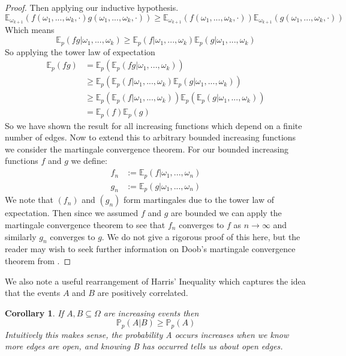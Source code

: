 \documentclass[a4paper,11pt]{article}
\newtheorem{corollary}[theorem]{Corollary}
\theoremstyle{definition}
\newcommand{\prob}{\mathbb{P}_p}
\newcommand{\expp}{\mathbb{E}_p}
\begin{document}
\begin{proof}
	Then applying our inductive hypothesis.
	$$\mathbb{E}_{\omega_{k+1}}(f(\omega_1,...,\omega_k,\cdot)g(\omega_1,...,\omega_k,\cdot))
	\geq \mathbb{E}_{\omega_{k+1}}(f(\omega_1,...,\omega_k,\cdot))\mathbb{E}_{\omega_{k+1}}(g(\omega_1,...,\omega_k,\cdot))$$
	Which means
	$$ \mathbb{E}_p(fg|\omega_1,...,\omega_k) \geq \mathbb{E}_p(f|\omega_1,...,\omega_k)\mathbb{E}_p(g|\omega_1,...,\omega_k)$$
	So applying the tower law of expectation 
	\begin{align*}
		\expp(fg) &= \expp(\expp(fg|\omega_1,...,\omega_k))\\
		&\geq \expp(\expp(f|\omega_1,...,\omega_k)\expp(g|\omega_1,...,\omega_k))\\
		&\geq \expp(\expp(f|\omega_1,...,\omega_k))\expp(\expp(g|\omega_1,...,\omega_k))\\
		&= \expp(f)\expp(g)
	\end{align*}
	So we have shown the result for all increasing functions which depend on a finite number of edges.
	Now to extend this to arbitrary bounded increasing functions we consider the martingale convergence theorem.
	For our bounded increasing functions $f$ and $g$ we define:
	\begin{align*}
		f_n &:= \expp(f | \omega_1,...,\omega_n)\\
		g_n &:= \expp(g | \omega_1,...,\omega_n)
	\end{align*}
	We note that $(f_n)$ and $(g_n)$ form martingales due to the tower law of expectation.
	Then since we assumed $f$ and $g$ are bounded we can apply the martingale convergence theorem to see that $f_n$ converges to $f$  as $n \rightarrow \infty$ and similarly $g_n$ converges to $g$.
	We do not give a rigorous proof of this here, but the reader may wish to seek further information on Doob's martingale convergence theorem from \cite{williams_1991}.
	

\end{proof}
We also note a useful rearrangement of Harris' Inequality which captures the idea that the events $A$ and $B$ are positively correlated.
\begin{corollary}
	If $A, B \subseteq \Omega$ are increasing events then 
	$$\prob(A|B) \geq \prob(A)$$
	Intuitively this makes sense, the probability A occurs increases when we know more edges are open, and knowing B has occurred tells us about open edges.
\end{corollary}
\end{document}
